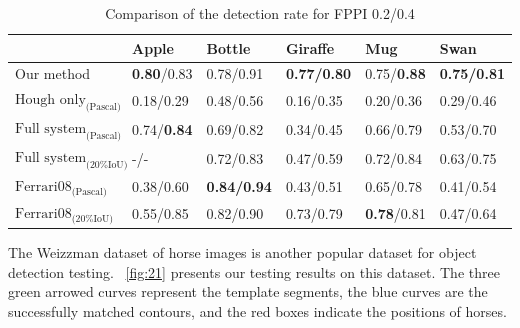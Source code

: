 \documentclass[journal]{IEEEtran}
\begin{document}
\begin{table}[!t]
\renewcommand{\arraystretch}{1.3}
\caption{Comparison of the detection rate for FPPI 0.2/0.4}
\label{tab:1}
\centering
\scriptsize
\begin{tabular}{l|lllll}
\hline
& Apple & Bottle & Giraffe & Mug & Swan \\
\hline
Our method
& \textbf{0.80}/0.83
& 0.78/0.91
& \textbf{0.77/0.80}
& 0.75/\textbf{0.88}
& \textbf{0.75/0.81}\\
$\text{Hough only}_\text{(Pascal)}$
& 0.18/0.29
& 0.48/0.56
& 0.16/0.35
& 0.20/0.36
& 0.29/0.46\\
$\text{Full system}_\text{(Pascal)}$
& 0.74/\textbf{0.84}
& 0.69/0.82
& 0.34/0.45
& 0.66/0.79
& 0.53/0.70\\
$\text{Full system}_\text{(20\% IoU)}$
& -/-
& 0.72/0.83
& 0.47/0.59
& 0.72/0.84
& 0.63/0.75\\
$\text{Ferrari08}_\text{(Pascal)}$
& 0.38/0.60
& \textbf{0.84/0.94}
& 0.43/0.51
& 0.65/0.78
& 0.41/0.54\\
$\text{Ferrari08}_\text{(20\% IoU)}$
& 0.55/0.85
& 0.82/0.90
& 0.73/0.79
& \textbf{0.78}/0.81
& 0.47/0.64\\
\hline
\end{tabular}
\end{table}

The Weizzman dataset of horse images is another popular dataset for object detection testing. 
\figurename~\ref{fig:21} presents our testing results on this dataset. 
The three green arrowed curves represent the template segments, 
the blue curves are the successfully matched contours, and the red boxes indicate the positions of horses.
\end{document}

